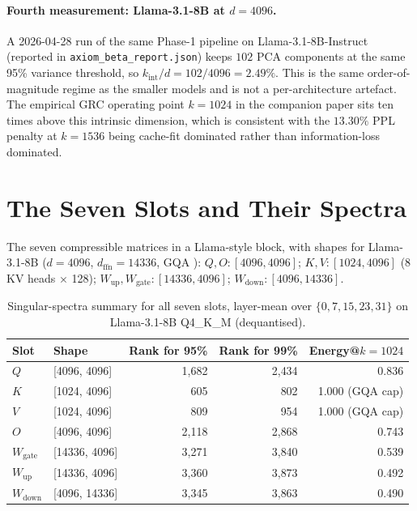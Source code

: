 \documentclass[11pt]{article}
\begin{document}
\paragraph{Fourth measurement: Llama-3.1-8B at $d{=}4096$.}
A 2026-04-28 run of the same Phase-1 pipeline on Llama-3.1-8B-Instruct
(reported in \texttt{axiom\_beta\_report.json}) keeps $102$ PCA components
at the same 95\% variance threshold, so $k_\text{int}/d = 102/4096 =
2.49\%$. This is the same order-of-magnitude regime as the smaller models
and is not a per-architecture artefact. The empirical GRC operating
point $k{=}1024$ in the companion paper sits ten times above this
intrinsic dimension, which is consistent with the $13.30\%$ PPL penalty
at $k{=}1536$ being cache-fit dominated rather than information-loss
dominated.

\section{The Seven Slots and Their Spectra}
\label{sec:spectra}

The seven compressible matrices in a Llama-style block, with shapes for
Llama-3.1-8B ($d{=}4096$, $d_\text{ffn}{=}14336$, GQA \cite{ainslie2023gqa}):
$Q,O\!:\![4096,4096]$;
$K,V\!:\![1024,4096]$ (8 KV heads $\times$ 128);
$W_\text{up},W_\text{gate}\!:\![14336,4096]$;
$W_\text{down}\!:\![4096,14336]$.

\begin{table}[h]\centering\small
\caption{Singular-spectra summary for all seven slots, layer-mean over
$\{0,7,15,23,31\}$ on Llama-3.1-8B Q4\_K\_M (dequantised).}
\label{tab:slots}
\begin{tabular}{@{}llrrr@{}}
\toprule
Slot & Shape & Rank for 95\% & Rank for 99\% & Energy@$k{=}1024$ \\
\midrule
$Q$               & [4096, 4096]   & 1{,}682 & 2{,}434 & 0.836 \\
$K$               & [1024, 4096]   &   605   &   802   & 1.000 (GQA cap) \\
$V$               & [1024, 4096]   &   809   &   954   & 1.000 (GQA cap) \\
$O$               & [4096, 4096]   & 2{,}118 & 2{,}868 & 0.743 \\
$W_\text{gate}$   & [14336, 4096]  & 3{,}271 & 3{,}840 & 0.539 \\
$W_\text{up}$     & [14336, 4096]  & 3{,}360 & 3{,}873 & 0.492 \\
$W_\text{down}$   & [4096, 14336]  & 3{,}345 & 3{,}863 & 0.490 \\
\bottomrule
\end{tabular}
\end{table}
\end{document}
